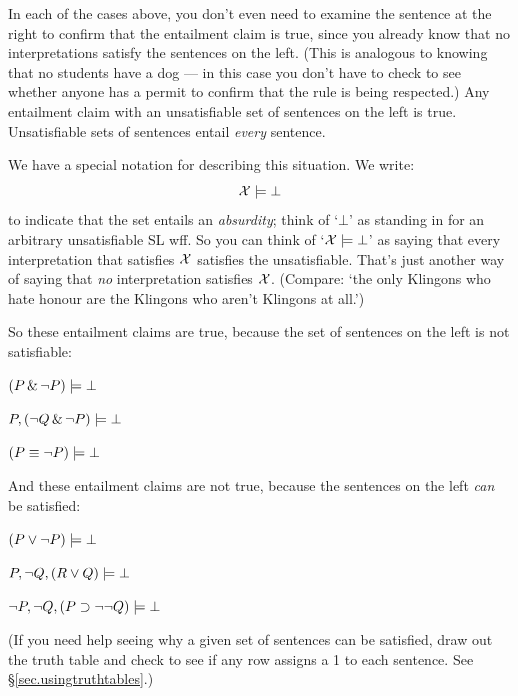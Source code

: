 In each of the cases above, you don't even need to examine the sentence at the right to confirm that the entailment claim is true, since you already know that no interpretations satisfy the sentences on the left. (This is analogous to knowing that no students have a dog --- in this case you don't have to check to see whether anyone has a permit to confirm that the rule is being respected.) Any entailment claim with an unsatisfiable set of sentences on the left is true. Unsatisfiable sets of sentences entail \emph{every} sentence.

We have a special notation for describing this situation. We write: $$\mathcal{X}{} \models \bot$$ to indicate that the set \metaSetX{} entails an \emph{absurdity}; think of `$\bot$' as standing in for an arbitrary unsatisfiable SL wff. So you can think of `$\mathcal{X}{} \models \bot$' as saying that every interpretation that satisfies $\mathcal{X}{}$ satisfies the unsatisfiable. That's just another way of saying that \emph{no} interpretation satisfies $\mathcal{X}{}$. (Compare: `the only Klingons who hate honour are the Klingons who aren't Klingons at all.')


So these entailment claims are true, because the set of sentences on the left is not satisfiable:

\begin{earg}
\item[] $(P \,\&\, \neg P) \models \bot$
\item[] $P, (\neg Q \,\&\, \neg P) \models\bot$
\item[] $(P \equiv\neg P) \models\bot$
\end{earg}

And these entailment claims are not true, because the sentences on the left \emph{can} be satisfied:

\begin{earg}
\item[] $(P \vee \neg P) \models\bot$
\item[] $P, \neg Q, (R \vee Q) \models\bot$
\item[] $\neg P, \neg Q, (P \supset \neg\neg Q) \models\bot$
\end{earg}

(If you need help seeing why a given set of sentences can be satisfied, draw out the truth table and check to see if any row assigns a 1 to each sentence. See \S\ref{sec.usingtruthtables}.)




